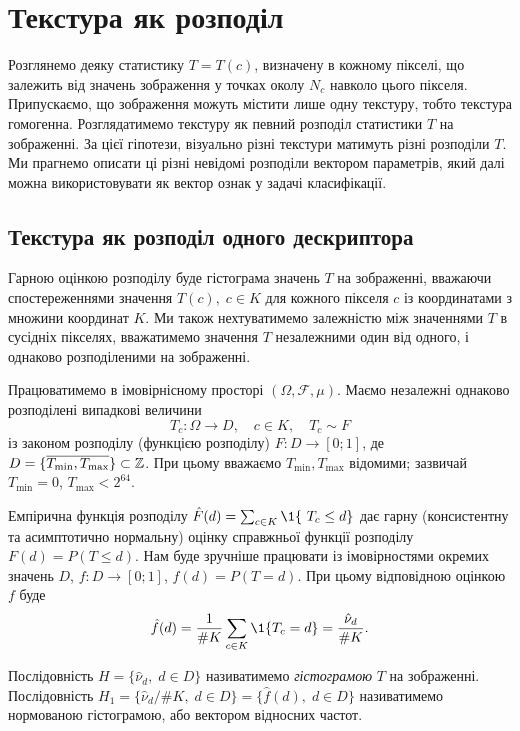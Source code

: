 
\section{Текстура як розподіл}\label{section1.2}\hfill

Розглянемо деяку статистику $T = T(c)$, визначену в кожному пікселі, що залежить від значень зображення у точках околу $N_c$ навколо цього пікселя.
Припускаємо, що зображення можуть містити лише одну текстуру, тобто текстура гомогенна.
Розглядатимемо текстуру як певний розподіл статистики $T$ на зображенні. 
За цієї гіпотези, візуально різні текстури матимуть різні розподіли $T$.
Ми прагнемо описати ці різні невідомі розподіли вектором параметрів, який далі можна використовувати як вектор ознак у задачі класифікації.

\subsection{Текстура як розподіл одного дескриптора}\label{section1.2a}\hfill

Гарною оцінкою розподілу буде гістограма значень $T$ на зображенні, вважаючи спостереженнями значення $T(c), \; c \in K$ для кожного пікселя $c$ із координатами з множини координат $K$.
Ми також нехтуватимемо залежністю між значеннями $T$ в сусідніх пікселях, вважатимемо значення $T$ незалежними один від одного, і однаково розподіленими на зображенні.

Працюватимемо в імовірнісному просторі $(\Omega, \mathcal F, \mu)$.
Маємо незалежні однаково розподілені випадкові величини 
\[ T_c \colon \Omega \to D, \quad c \in K, \quad T_c \sim F \] 
із законом розподілу (функцією розподілу) $F \colon D \to [0;1]$, де $D = \{\overline{T_{\min}, T_{\max}}\} \subset \mathbb Z$.
При цьому вважаємо $T_{\min}, T_{\max}$ відомими; зазвичай $T_{\min} = 0$, $T_{\max} < 2^{64}$.

Емпірична функція розподілу $\hat F(d) = \sum_{c\in K} \1\{\ T_c \le d \}$
дає гарну (консистентну та асимптотично нормальну) оцінку справжньої функції розподілу $F(d) = P(T \le d)$.
Нам буде зручніше працювати із імовірностями окремих значень $D$, $f \colon D \to [0;1]$, $f(d) = P(T = d)$.
При цьому відповідною оцінкою $f$ буде 
\[\hat f(d) = \frac{1}{\# K}\sum_{c\in K}\1\{T_c = d\} = \frac{\hat\nu_d}{\# K}.\]

Послідовність $H = \{ \hat \nu_d, \; d\in D \}$ називатимемо \textit{гістограмою} $T$ на зображенні.
Послідовність $H_1 = \{ \hat \nu_d / \# K, \; d\in D \} = \{\hat f(d), \; d\in D\}$ називатимемо нормованою гістограмою, або вектором відносних частот.

